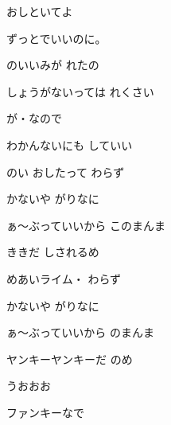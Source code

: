 \documentclass[a4paper,tate,twocolumn,12pt]{ltjtarticle}
\begin{document}
\thispagestyle{empty}

\begin{center}
{\LARGE おしといてよ}

{\large ずっとでいいのに。}
\end{center}

\vspace{1em}

\begin{flushleft}

\noindent\begin{minipage}{\linewidth}
のいいみが れたの

しょうがないっては れくさい

が・なので

わかんないにも していい
\end{minipage}

\vspace{2em}

\noindent\begin{minipage}{\linewidth}
のい おしたって わらず

かないや がりなに

ぁ～ぶっていいから このまんま

ききだ しされるめ

めあいライム・ わらず

かないや がりなに

ぁ～ぶっていいから のまんま

ヤンキーヤンキーだ のめ

うおおお
\end{minipage}

\vspace{2em}

\noindent\begin{minipage}{\linewidth}
ファンキーなで


\end{minipage}
\end{flushleft}
\end{document}
